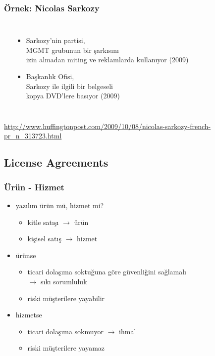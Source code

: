\documentclass[dvipsnames]{beamer}
\theoremstyle{definition}
\theoremstyle{example}
\theoremstyle{plain}
\begin{document}
\begin{frame}
  \frametitle{Örnek: Nicolas Sarkozy}

  \begin{columns}
    \begin{center}
    \end{center}

    \begin{itemize}
      \item Sarkozy'nin partisi,\\
        MGMT grubunun bir şarkısını\\
        izin almadan miting ve reklamlarda kullanıyor (2009)
      \item Başkanlık Ofisi,\\
        Sarkozy ile ilgili bir belgeseli\\
        kopya DVD'lere basıyor (2009)
    \end{itemize}
  \end{columns}

  \medskip
  \tiny{\url{http://www.huffingtonpost.com/2009/10/08/nicolas-sarkozy-french-pr_n_313723.html}}\\
\end{frame}

\subsection{License Agreements}

\begin{frame}
  \frametitle{Ürün - Hizmet}

  \begin{itemize}
    \item yazılım ürün mü, hizmet mi?
    \begin{itemize}
      \item kitle satışı $\rightarrow$ ürün
      \item kişisel satış $\rightarrow$ hizmet
    \end{itemize}

    \pause
    \medskip
    \item ürünse
    \begin{itemize}
      \item ticari dolaşıma soktuğuna göre güvenliğini sağlamalı\\
        $\rightarrow$ sıkı sorumluluk
      \item riski müşterilere yayabilir
    \end{itemize}

    \pause
    \item hizmetse
    \begin{itemize}
      \item ticari dolaşıma sokmuyor $\rightarrow$ ihmal
      \item riski müşterilere yayamaz
    \end{itemize}
  \end{itemize}
\end{frame}
\end{document}
